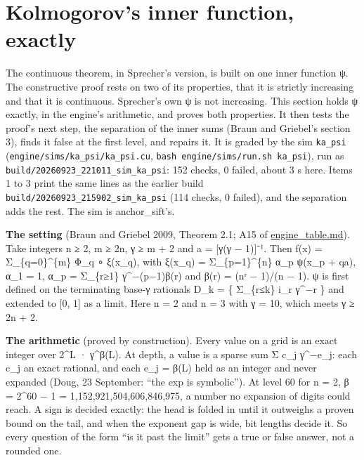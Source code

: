 \section{\texorpdfstring{Kolmogorov's inner function, exactly}{Kolmogorov's inner function, exactly}}

The continuous theorem, in Sprecher's version, is built on one inner function ψ. The constructive proof rests on two of its properties, that it is strictly increasing and that it is continuous. Sprecher's own ψ is not increasing. This section holds ψ exactly, in the engine's arithmetic, and proves both properties. It then tests the proof's next step, the separation of the inner sums (Braun and Griebel's section 3), finds it false at the first level, and repairs it. It is graded by the sim \texttt{ka\_\allowbreak{}psi} (\texttt{engine/\allowbreak{}sims/\allowbreak{}ka\_\allowbreak{}psi/\allowbreak{}ka\_\allowbreak{}psi.\allowbreak{}cu}, \texttt{bash engine/\allowbreak{}sims/\allowbreak{}run.\allowbreak{}sh ka\_\allowbreak{}psi}), run as \texttt{build/\allowbreak{}20260923\_\allowbreak{}221011\_\allowbreak{}sim\_\allowbreak{}ka\_\allowbreak{}psi}: 152 checks, 0 failed, about 3 s here. Items 1 to 3 print the same lines as the earlier build \texttt{build/\allowbreak{}20260923\_\allowbreak{}215902\_\allowbreak{}sim\_\allowbreak{}ka\_\allowbreak{}psi} (114 checks, 0 failed), and the separation adds the rest. The sim is anchor\_\allowbreak{}sift's.

\textbf{The setting} (Braun and Griebel 2009, Theorem 2.1; A15 of \hyperref[chap:engine-table]{engine\_\allowbreak{}table.md}). Take integers n ≥ 2, m ≥ 2n, γ ≥ m + 2 and a = [γ(γ − 1)]⁻¹. Then f(x) = Σ\_\allowbreak{}\{q=0\}\textasciicircum{}\{m\} Φ\_\allowbreak{}q ∘ ξ(x\_\allowbreak{}q), with ξ(x\_\allowbreak{}q) = Σ\_\allowbreak{}\{p=1\}\textasciicircum{}\{n\} α\_\allowbreak{}p ψ(x\_\allowbreak{}p + qa), α\_\allowbreak{}1 = 1, α\_\allowbreak{}p = Σ\_\allowbreak{}\{r≥1\} γ\textasciicircum{}−(p−1)β(r) and β(r) = (nʳ − 1)/(n − 1). ψ is first defined on the terminating base-γ rationals D\_\allowbreak{}k = \{ Σ\_\allowbreak{}\{r≤k\} i\_\allowbreak{}r γ\textasciicircum{}−r \} and extended to [0, 1] as a limit. Here n = 2 and n = 3 with γ = 10, which meets γ ≥ 2n + 2.

\textbf{The arithmetic} (proved by construction). Every value on a grid is an exact integer over 2\textasciicircum{}L · γ\textasciicircum{}β(L). At depth, a value is a sparse sum Σ c\_\allowbreak{}j γ\textasciicircum{}−e\_\allowbreak{}j: each c\_\allowbreak{}j an exact rational, and each e\_\allowbreak{}j = β(L) held as an integer and never expanded (Doug, 23 September: “the exp is symbolic”). At level 60 for n = 2, β = 2\textasciicircum{}60 − 1 = 1,152,921,504,606,846,975, a number no expansion of digits could reach. A sign is decided exactly: the head is folded in until it outweighs a proven bound on the tail, and when the exponent gap is wide, bit lengths decide it. So every question of the form “is it past the limit” gets a true or false answer, not a rounded one.

